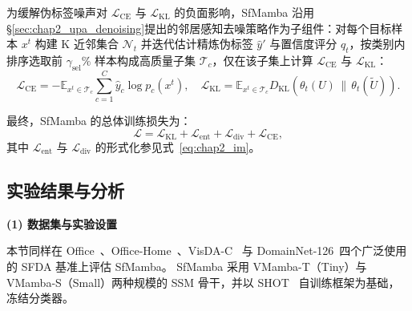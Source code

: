 为缓解伪标签噪声对 $\mathcal{L}_{\text{CE}}$ 与 $\mathcal{L}_{\text{KL}}$ 的负面影响，SfMamba 沿用§\ref{sec:chap2_upa_denoising}提出的邻居感知去噪策略作为子组件：对每个目标样本 $x^t$ 构建 K 近邻集合 $\mathcal{N}_t$ 并迭代估计精炼伪标签 $\hat{y}'$ 与置信度评分 $q_t$，按类别内排序选取前 $\gamma_{\text{sel}}\%$ 样本构成高质量子集 $\mathcal{T}_c$，仅在该子集上计算 $\mathcal{L}_{\text{CE}}$ 与 $\mathcal{L}_{\text{KL}}$：
\begin{equation}
\mathcal{L}_{\text{CE}} = -\mathbb{E}_{x^t \in \mathcal{T}_c} \sum_{c=1}^{C} \hat{y}_c \log p_c(x^t), \quad
\mathcal{L}_{\text{KL}} = \mathbb{E}_{x^t \in \mathcal{T}_c} D_{\text{KL}}\!\left(\theta_t(U) \,\|\, \theta_t(\tilde{U})\right).
\label{eq:scs_loss_ch}
\end{equation}

最终，SfMamba 的总体训练损失为：
\begin{equation}
\mathcal{L} = \mathcal{L}_{\text{KL}} + \mathcal{L}_{\text{ent}} + \mathcal{L}_{\text{div}} + \mathcal{L}_{\text{CE}},
\label{eq:scs_total_loss}
\end{equation}
其中 $\mathcal{L}_{\text{ent}}$ 与 $\mathcal{L}_{\text{div}}$ 的形式化参见式~\eqref{eq:chap2_im}。


\subsection{实验结果与分析}

\noindent\textbf{(1) 数据集与实验设置}

本节同样在 Office~\cite{saenko2010adapting}、Office-Home~\cite{venkateswara2017deep}、VisDA-C~\cite{peng2017visda} 与 DomainNet-126~\cite{saito2019semi}四个广泛使用的 SFDA 基准上评估 SfMamba。
SfMamba 采用 VMamba-T（Tiny）与 VMamba-S（Small）两种规模的 SSM 骨干，并以 SHOT~\cite{liang2021source} 自训练框架为基础，冻结分类器。

